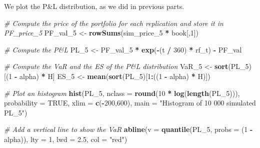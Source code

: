 \documentclass[]{article}
\newenvironment{Shaded}{\begin{snugshade}}{\end{snugshade}}
\newcommand{\CommentTok}[1]{\textcolor[rgb]{0.56,0.35,0.01}{\textit{#1}}}
\newcommand{\DataTypeTok}[1]{\textcolor[rgb]{0.13,0.29,0.53}{#1}}
\newcommand{\DecValTok}[1]{\textcolor[rgb]{0.00,0.00,0.81}{#1}}
\newcommand{\FloatTok}[1]{\textcolor[rgb]{0.00,0.00,0.81}{#1}}
\newcommand{\KeywordTok}[1]{\textcolor[rgb]{0.13,0.29,0.53}{\textbf{#1}}}
\newcommand{\NormalTok}[1]{#1}
\newcommand{\OperatorTok}[1]{\textcolor[rgb]{0.81,0.36,0.00}{\textbf{#1}}}
\newcommand{\OtherTok}[1]{\textcolor[rgb]{0.56,0.35,0.01}{#1}}
\newcommand{\StringTok}[1]{\textcolor[rgb]{0.31,0.60,0.02}{#1}}
\begin{document}
We plot the P\&L distribution, as we did in previous parts.

\begin{Shaded}
\begin{Highlighting}[]
\CommentTok{\# Compute the price of the portfolio for each replication and store it in \textquotesingle{}PF\_price\_5\textquotesingle{}}
\NormalTok{PF\_val\_}\DecValTok{5}\NormalTok{ <{-}}\StringTok{ }\KeywordTok{rowSums}\NormalTok{(sim\_price\_}\DecValTok{5} \OperatorTok{*}\StringTok{ }\NormalTok{book[,}\DecValTok{1}\NormalTok{])}

\CommentTok{\# Compute the P\&L}
\NormalTok{PL\_}\DecValTok{5}\NormalTok{ <{-}}\StringTok{ }\NormalTok{PF\_val\_}\DecValTok{5} \OperatorTok{*}\StringTok{ }\KeywordTok{exp}\NormalTok{(}\OperatorTok{{-}}\NormalTok{(t }\OperatorTok{/}\StringTok{ }\DecValTok{360}\NormalTok{) }\OperatorTok{*}\StringTok{ }\NormalTok{rf\_t) }\OperatorTok{{-}}\StringTok{ }\NormalTok{PF\_val}

\CommentTok{\# Compute the VaR and the ES of the P\&L distribution}
\NormalTok{VaR\_}\DecValTok{5}\NormalTok{ <{-}}\StringTok{ }\KeywordTok{sort}\NormalTok{(PL\_}\DecValTok{5}\NormalTok{)[(}\DecValTok{1} \OperatorTok{{-}}\StringTok{ }\NormalTok{alpha) }\OperatorTok{*}\StringTok{ }\NormalTok{H]}
\NormalTok{ES\_}\DecValTok{5}\NormalTok{  <{-}}\StringTok{ }\KeywordTok{mean}\NormalTok{(}\KeywordTok{sort}\NormalTok{(PL\_}\DecValTok{5}\NormalTok{)[}\DecValTok{1}\OperatorTok{:}\NormalTok{((}\DecValTok{1} \OperatorTok{{-}}\StringTok{ }\NormalTok{alpha) }\OperatorTok{*}\StringTok{ }\NormalTok{H)])}

\CommentTok{\# Plot an histogram}
\KeywordTok{hist}\NormalTok{(PL\_}\DecValTok{5}\NormalTok{, }\DataTypeTok{nclass =} \KeywordTok{round}\NormalTok{(}\DecValTok{10} \OperatorTok{*}\StringTok{ }\KeywordTok{log}\NormalTok{(}\KeywordTok{length}\NormalTok{(PL\_}\DecValTok{5}\NormalTok{))), }
           \DataTypeTok{probability =} \OtherTok{TRUE}\NormalTok{, }\DataTypeTok{xlim =} \KeywordTok{c}\NormalTok{(}\OperatorTok{{-}}\DecValTok{200}\NormalTok{,}\DecValTok{600}\NormalTok{),}
           \DataTypeTok{main =} \StringTok{"Histogram of 10 000 simulated PL\_5"}\NormalTok{)}

\CommentTok{\# Add a vertical line to show the VaR}
\KeywordTok{abline}\NormalTok{(}\DataTypeTok{v   =} \KeywordTok{quantile}\NormalTok{(PL\_}\DecValTok{5}\NormalTok{, }\DataTypeTok{probs =}\NormalTok{ (}\DecValTok{1} \OperatorTok{{-}}\StringTok{ }\NormalTok{alpha)),}
       \DataTypeTok{lty =} \DecValTok{1}\NormalTok{,}
       \DataTypeTok{lwd =} \FloatTok{2.5}\NormalTok{,}
       \DataTypeTok{col =} \StringTok{"red"}\NormalTok{)}
\end{Highlighting}
\end{Shaded}
\end{document}
